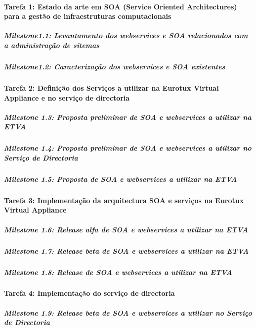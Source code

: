 \documentclass[a4paper,12pt,portugues]{article}
\begin{document}
\paragraph{Tarefa 1: Estado da arte em SOA (Service Oriented Architectures) para a gestão de infraestruturas computacionais} %

\subparagraph{Milestone1.1: Levantamento dos webservices e SOA relacionados com a administração de sitemas} %

\subparagraph{Milestone1.2: Caracterização dos webservices e SOA existentes} %


\paragraph{Tarefa 2: Definição dos Serviços a utilizar na Eurotux Virtual Appliance e no serviço de directoria} %


\subparagraph{Milestone 1.3: Proposta preliminar de SOA e webservices a utilizar na ETVA} %


\subparagraph{Milestone 1.4: Proposta preliminar de SOA e webservices a utilizar no Serviço de Directoria} %


\subparagraph{Milestone 1.5: Proposta de SOA e webservices a utilizar na ETVA} %



\paragraph{Tarefa 3: Implementação da arquitectura SOA e serviços na Eurotux Virtual Appliance} %
\label{par:implementação_da_arquitectura_soa_e_servios_na_eurotux_virtual_appliance}

\subparagraph{Milestone 1.6: Release alfa de SOA e webservices a utilizar na ETVA} %

\subparagraph{Milestone 1.7: Release beta de SOA e webservices a utilizar na ETVA} %

\subparagraph{Milestone 1.8: Release de SOA e webservices a utilizar na ETVA} %


\paragraph{Tarefa 4: Implementação do serviço de directoria} %
\label{par:implementação_do_serviço_de_directoria}


\subparagraph{Milestone 1.9: Release beta de  SOA e webservices a utilizar no Serviço de Directoria} %
\end{document}
